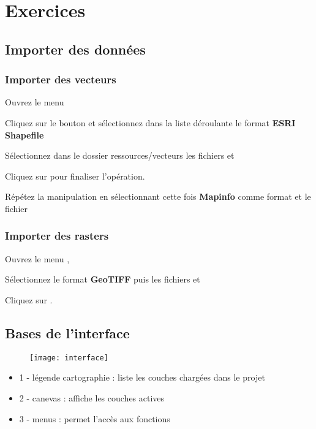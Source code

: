 \chapter{Exercices}

\section{Importer des données}

\subsection{Importer des vecteurs}

Ouvrez le menu  \arrow {}

Cliquez sur le bouton  et sélectionnez dans la liste déroulante le format \textbf{ESRI Shapefile}

Sélectionnez dans le dossier ressources/vecteurs les fichiers  et 

Cliquez sur  pour finaliser l'opération.

Répétez la manipulation en sélectionnant cette fois \textbf{Mapinfo} comme format et le fichier 

\subsection{Importer des rasters}

Ouvrez le menu  \arrow {}, 

Sélectionnez le format \textbf{GeoTIFF} puis les fichiers  et  

Cliquez sur .

\section{Bases de l'interface}

\begin{figure}[ht]
   \centering
   \texttt{[image: interface]}
\end{figure}

\begin{itemize}
\item 1 - légende cartographie : liste les couches chargées dans le projet
\item 2 - canevas : affiche les couches actives
\item 3 - menus : permet l'accès aux fonctions
\end{itemize}

